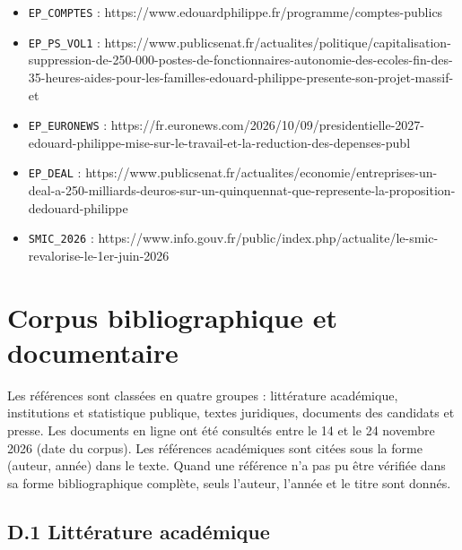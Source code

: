 \documentclass[
  11pt,
  11pt,
  a4paper,
  openany]{book}
\begin{document}
\begin{itemize}
\item
  \texttt{EP\_COMPTES} :
  https://www.edouardphilippe.fr/programme/comptes-publics
\item
  \texttt{EP\_PS\_VOL1} :
  https://www.publicsenat.fr/actualites/politique/capitalisation-suppression-de-250-000-postes-de-fonctionnaires-autonomie-des-ecoles-fin-des-35-heures-aides-pour-les-familles-edouard-philippe-presente-son-projet-massif-et
\item
  \texttt{EP\_EURONEWS} :
  https://fr.euronews.com/2026/10/09/presidentielle-2027-edouard-philippe-mise-sur-le-travail-et-la-reduction-des-depenses-publ
\item
  \texttt{EP\_DEAL} :
  https://www.publicsenat.fr/actualites/economie/entreprises-un-deal-a-250-milliards-deuros-sur-un-quinquennat-que-represente-la-proposition-dedouard-philippe
\item
  \texttt{SMIC\_2026} :
  https://www.info.gouv.fr/public/index.php/actualite/le-smic-revalorise-le-1er-juin-2026
\end{itemize}

\hypertarget{sec:annexe-d}{%
\chapter{Corpus bibliographique et documentaire}\label{sec:annexe-d}}

Les références sont classées en quatre groupes : littérature académique,
institutions et statistique publique, textes juridiques, documents des
candidats et presse. Les documents en ligne ont été consultés entre le
14 et le 24 novembre 2026 (date du corpus). Les références académiques
sont citées sous la forme (auteur, année) dans le texte. Quand une
référence n'a pas pu être vérifiée dans sa forme bibliographique
complète, seuls l'auteur, l'année et le titre sont donnés.

\hypertarget{d.1-littuxe9rature-acaduxe9mique}{%
\section{D.1 Littérature
académique}\label{d.1-littuxe9rature-acaduxe9mique}}
\end{document}
